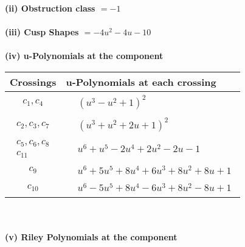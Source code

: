 \documentclass[1p]{elsarticle_modified}
\theoremstyle{definition}
\begin{document}
\flushleft \textbf{(ii) Obstruction class $= -1$}\\~\\
\flushleft \textbf{(iii) Cusp Shapes $= -4 u^2-4 u-10$}\\~\\
\newpage\renewcommand{\arraystretch}{1}
\flushleft \textbf{(iv) u-Polynomials at the component}\newline \\
\begin{tabular}{m{50pt}|m{274pt}}
Crossings & \hspace{64pt}u-Polynomials at each crossing \\
\hline $$\begin{aligned}c_{1},c_{4}\end{aligned}$$&$\begin{aligned}
&(u^3- u^2+1)^2
\end{aligned}$\\
\hline $$\begin{aligned}c_{2},c_{3},c_{7}\end{aligned}$$&$\begin{aligned}
&(u^3+u^2+2 u+1)^2
\end{aligned}$\\
\hline $$\begin{aligned}c_{5},c_{6},c_{8}\\c_{11}\end{aligned}$$&$\begin{aligned}
&u^6+u^5-2 u^4+2 u^2-2 u-1
\end{aligned}$\\
\hline $$\begin{aligned}c_{9}\end{aligned}$$&$\begin{aligned}
&u^6+5 u^5+8 u^4+6 u^3+8 u^2+8 u+1
\end{aligned}$\\
\hline $$\begin{aligned}c_{10}\end{aligned}$$&$\begin{aligned}
&u^6-5 u^5+8 u^4-6 u^3+8 u^2-8 u+1
\end{aligned}$\\
\hline
\end{tabular}\\~\\
\newpage\renewcommand{\arraystretch}{1}
\flushleft \textbf{(v) Riley Polynomials at the component}\newline \\
\end{document}
